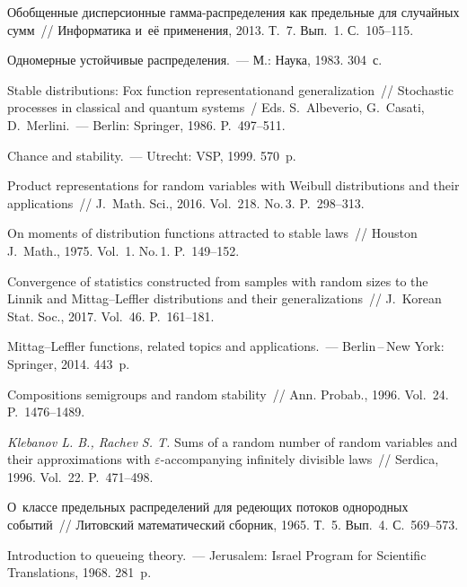 \begin{multicols}{2}
{{\begin{thebibliography}{99}
 Обобщенные дисперсионные
гамма-распределения как предельные для случайных сумм~// 
Информатика и~её применения, 2013. Т.~7. Вып.~1. С.~105--115.

 Одномерные устойчивые распределения.~--- М.: Наука, 1983.
304~с.

 Stable distributions: Fox
function representationand generalization~// 
Stochastic processes in classical and quantum systems~/ Eds. 
S.~Albeverio, G.~Casati, D.~Merlini.~--- Berlin: Springer, 1986. P.~497--511.

Chance and stability.~--- Utrecht: VSP, 1999. 570~p.

 Product representations for random variables with 
Weibull distributions and their applications~// J.~Math. Sci., 
2016. Vol.~218. No.\,3. P.~298--313.

 On moments of distribution functions
attracted to stable laws~// Houston J.~Math., 1975.
Vol.~1. No.\,1. P.~149--152.

Convergence of statistics constructed from samples with
random sizes to the Linnik and Mittag--Leffler distributions and
their generalizations~// J.~Korean Stat. Soc.,
2017. Vol.~46. P.~161--181.

Mittag--Leffler functions, related topics and applications.~---
Berlin\,--\,New York: Springer, 2014. 443~p.

\columnbreak

 Compositions semigroups and random stability~//
Ann. Probab., 1996. Vol.~24. P.~1476--1489.

 {\it Klebanov L. B., Rachev S. T.} Sums of a random number of random variables and their approximations with $\varepsilon$-accompanying
infinitely divisible laws~// Serdica, 1996. Vol.~22. P.~471--498.

 О~классе предельных распределений для
редеющих потоков однородных событий~// Литовский математический
сборник, 1965. Т.~5. Вып.~4. С.~569--573.

 Introduction to queueing theory.~--- Jerusalem: Israel Program for 
 Scientific Translations, 1968. 281~p.


\end{thebibliography}}}
\end{multicols}
